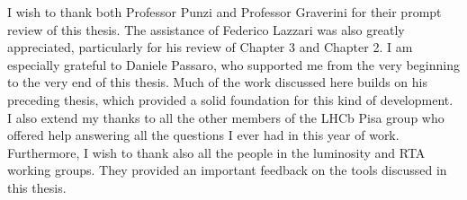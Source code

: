 I wish to thank both Professor Punzi and Professor Graverini for their prompt review of this thesis. The assistance of Federico Lazzari was also greatly appreciated, particularly for his review of Chapter 3 and Chapter 2. I am especially grateful to Daniele Passaro, who supported me from the very beginning to the very end of this thesis. Much of the work discussed here builds on his preceding thesis, which provided a solid foundation for this kind of development. I also extend my thanks to all the other members of the LHCb Pisa group who offered help answering all the questions I ever had in this year of work. 
Furthermore, I wish to thank also all the people in the luminosity and RTA working groups. They provided an important feedback on the tools discussed in this thesis.